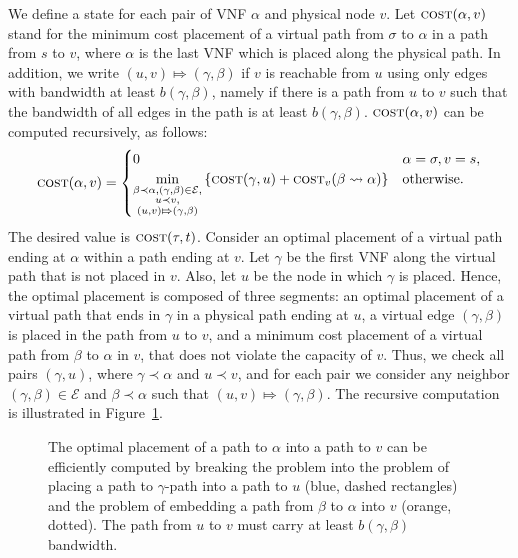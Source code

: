 \documentclass[11pt]{article}
\newcommand{\set}[1]{\left\{ #1 \right\}}
\newcommand{\calE}{\mathcal{E}}
\newcommand{\cost}{\textsc{cost}\xspace}
\begin{document}
We define a state for each pair of VNF $\alpha$ and physical node $v$.
Let $\cost(\alpha,v)$ stand for the minimum cost placement of a
virtual path from $\sigma$ to $\alpha$ in a path from $s$ to $v$,
where $\alpha$ is the last VNF which is placed along the physical
path.
%
In addition, we write $(u, v) \Mapsto (\gamma,\beta)$ if $v$ is
reachable from $u$ using only edges with bandwidth at least
$b(\gamma,\beta)$, namely if there is a path from $u$ to $v$ such that
the bandwidth of all edges in the path is at least $b(\gamma,\beta)$.
%
$\cost(\alpha,v)$ can be computed recursively, as follows:
\[
\cost(\alpha,v) =
\begin{cases}
0 & \alpha = \sigma, v = s, \\
\displaystyle
\min_{
  \substack{\beta \prec \alpha, (\gamma,\beta) \in \calE, \\
           u \prec v, \\
         (u,v) \Mapsto (\gamma,\beta)}
     }
  \set{\cost(\gamma,u) + \cost_v(\beta \leadsto \alpha)}
  & \text{otherwise}.
\end{cases}
\]
The desired value is $\cost(\tau,t)$.
%
Consider an optimal placement of a virtual path ending at $\alpha$
within a path ending at $v$.  Let $\gamma$ be the first VNF along the
virtual path that is not placed in $v$.  Also, let $u$ be the node in
which $\gamma$ is placed.  Hence, the optimal placement is composed of
three segments: an optimal placement of a virtual path that ends in
$\gamma$ in a physical path ending at $u$, a virtual edge
$(\gamma,\beta)$ is placed in the path from $u$ to $v$, and a minimum
cost placement of a virtual path from $\beta$ to $\alpha$ in $v$, that
does not violate the capacity of $v$.
%
Thus, we check all pairs $(\gamma,u)$, where $\gamma \prec \alpha$ and
$u \prec v$, and for each pair we consider any neighbor
$(\gamma,\beta) \in \calE$ and $\beta \prec \alpha$ such that $(u, v)
\Mapsto (\gamma,\beta)$.
%
The recursive computation is illustrated in Figure~\ref{fig:dp1}.

\begin{figure}[t]
\centering
\scalebox{0.9}{

}
\caption{The optimal placement of a path to $\alpha$ into a path to
  $v$ can be efficiently computed by breaking the problem into the
  problem of placing a path to $\gamma$-path into a path to $u$ (blue,
  dashed rectangles) and the problem of embedding a path from $\beta$
  to $\alpha$ into $v$ (orange, dotted).  The path from $u$ to $v$
  must carry at least $b(\gamma,\beta)$ bandwidth.  }
\label{fig:dp1}
\end{figure}
\end{document}
